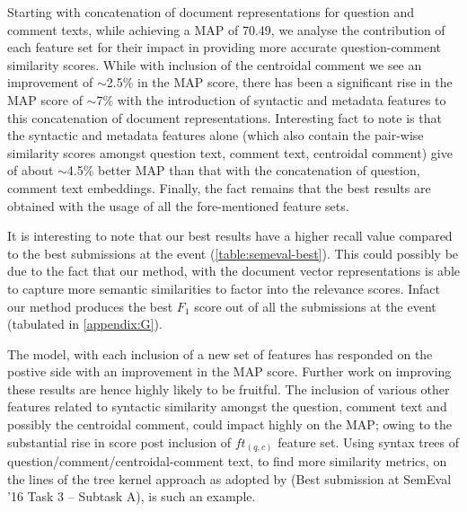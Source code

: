 \documentclass[12pt, a4paper, oneside]{Thesis} %
\begin{document}
Starting with concatenation of document representations for question and comment texts, while achieving a MAP of 70.49, we analyse the contribution of each feature set for their impact in providing more accurate question-comment similarity scores. While with inclusion of the centroidal comment we see an improvement of $\sim$2.5\% in the MAP score, there has been a significant rise in the MAP score of $\sim$7\% with the introduction of syntactic and metadata features to this concatenation of document representations. Interesting fact to note is that the syntactic and metadata features alone (which also contain the pair-wise similarity scores amongst question text, comment text, centroidal comment) give of about $\sim$4.5\% better MAP than that with the concatenation of question, comment text embeddings. Finally, the fact remains that the best results are obtained with the usage of all the fore-mentioned feature sets.

It is interesting to note that our best results have a higher recall value compared to the best submissions at the event (\autoref{table:semeval-best}). This could possibly be due to the fact that our method, with the document vector representations is able to capture more semantic similarities to factor into the relevance scores. Infact our method produces the best $F_{1}$ score out of all the submissions at the event (tabulated in \autoref{appendix:G}).

The model, with each inclusion of a new set of features has responded on the postive side with an improvement in the MAP score. Further work on improving these results are hence highly likely to be fruitful. The inclusion of various other features related to syntactic similarity amongst the question, comment text and possibly the centroidal comment, could impact highly on the MAP; owing to the substantial rise in score post inclusion of $ft_{(q,c)}$ feature set. Using syntax trees of question/comment/centroidal-comment text, to find more similarity metrics, on the lines of the tree kernel approach as adopted by \cite{filice2016kelp} (Best submission at SemEval '16 Task 3 -- Subtask A), \cite{joty2016convkn} is such an example.


\end{document}
